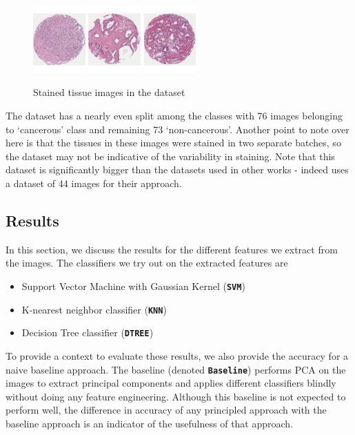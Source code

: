 \begin{figure}
\includegraphics[width=2.0cm]{figs/41_red.pdf}
\includegraphics[width=2.0cm]{figs/108_green.pdf}
\includegraphics[width=2.0cm]{figs/109_red.pdf}
\caption{Stained tissue images in the dataset}
\label{fig:TissueImageExample}

\end{figure}  
  

The dataset has a nearly even split among the classes with 76 images belonging to `cancerous' class and remaining 73 `non-cancerous'. Another point to note over here is that the tissues in these images were stained in two separate batches, so the dataset may not be indicative of the variability in staining. Note that this dataset is significantly bigger than the datasets used in other works - indeed \cite{naik2007gland} uses a dataset of 44 images for their approach.


\subsection{Results}
In this section, we discuss the results for the different features we extract from the images. The classifiers we try out on the extracted features are 
\begin{itemize}
\item Support Vector Machine with Gaussian Kernel (\textbf{\texttt{SVM}})
\item K-nearest neighbor classifier (\textbf{\texttt{KNN}})
\item Decision Tree classifier (\textbf{\texttt{DTREE}})
\end{itemize}

To provide a context to evaluate these results, we also provide the accuracy for a naive baseline approach. The baseline (denoted \textbf{\texttt{Baseline}}) performs PCA on the images to extract principal components and applies different classifiers blindly without doing any feature engineering. Although this baseline is not expected to perform well, the difference in accuracy of any principled approach with the baseline approach is an indicator of the usefulness of that approach.


